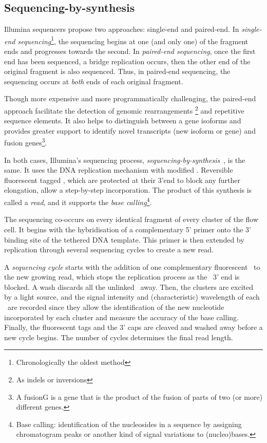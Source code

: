 \subsection{Sequencing-by-synthesis}%
\label{subsub:sequencing}

Illumina sequencers propose two approaches: single-end and paired-end.
In \emph{single-end sequencing}\footnote{Chronologically
the oldest method}, the sequencing begins at one (and only one) of the fragment
ends and progresses towards the second.
In \emph{paired-end sequencing},
once the first end has been sequenced,
a bridge replication occurs,
then the other end of the original fragment is also sequenced.
Thus, in paired-end sequencing,
the sequencing occurs at \emph{both} ends of each original fragment.\mybr\

Though more expensive and more programmatically challenging,
the paired-end approach facilitate the detection of genomic rearrangements%
\footnote{As indels or inversions} and
repetitive sequence elements.
It also helps to distinguish between a gene isoforms
and provides greater support to identify novel transcripts (new isoform or gene)
and fusion genes\footnote{A \gls{fusionG} is a gene
that is the product of the fusion of
parts of two (or more) different genes.}.\mybr\

In both cases, Illumina's sequencing process,
\emph{sequencing-by-synthesis}~,
is the same.
It uses the \gls{DNA} replication mechanism with modified \dNTPs.
Reversible fluorescent tagged \dNTPs,
which are protected at their 3'end to block any further elongation,
allow a step-by-step incorporation.
The product of this synthesis is called a \emph{read}, and
it supports the \emph{base calling}\footnote{Base calling:
identification of the nucleosides in a sequence
by assigning chromatogram peaks
or another kind of signal variations
to (nucleo){}bases.}.\mybr\

The sequencing co-occurs on every identical fragment
of every cluster of the flow cell.
It begins with the hybridisation of a complementary 5' primer onto the 3' binding
site of the tethered \gls{DNA} template. This primer is then extended by
replication through several sequencing cycles to create a new read.\mybr\

A \emph{sequencing cycle} starts with the addition of one complementary
fluorescent \dNTP\ to the new growing read,
which stops the replication process as the \dNTPs\ 3' end is blocked.
A wash discards all the unlinked \dNTPs\ away.
Then, the clusters are excited by a light source,
and the signal intensity and (characteristic) wavelength
of each \dNTPs\ are recorded
since they allow the identification of the new nucleotide incorporated
by each cluster and measure the accuracy of the base calling.
Finally, the fluorescent tags and the 3' caps are cleaved
and washed away before a new cycle begins.
The number of cycles determines the final read length.\mybr\

